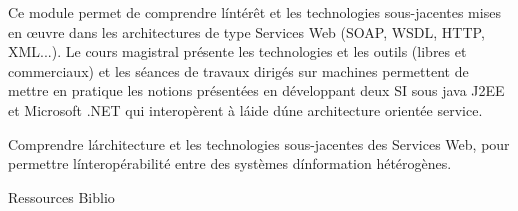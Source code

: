 \vfill

{
Ce module permet de comprendre l\'intérêt et les technologies sous-jacentes mises en \oe uvre dans les architectures de type
Services Web (SOAP, WSDL, HTTP, XML...). Le cours magistral présente les technologies et les outils (libres et commerciaux)
et les séances de travaux dirigés sur machines permettent de mettre en pratique les notions présentées en développant deux
SI sous java J2EE et Microsoft .NET qui interopèrent à l\'aide d\'une architecture orientée service. 
} 
{} 
{\begin{itemize}
\ObjItem Comprendre l\'architecture et les technologies sous-jacentes des Services Web, pour permettre l\'interopérabilité entre des systèmes d\'information hétérogènes.
\end{itemize} 
} 
{Ressources} 
{Biblio} 
 
\vfill

